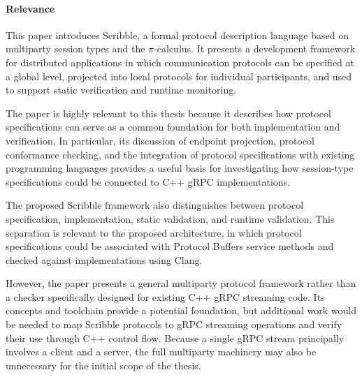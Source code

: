 \paragraph{Relevance}
This paper introduces Scribble, a formal protocol description language based on multiparty session types and the $\pi$-calculus. It presents a development framework for distributed applications in which communication protocols can be specified at a global level, projected into local protocols for individual participants, and used to support static verification and runtime monitoring.

The paper is highly relevant to this thesis because it describes how protocol specifications can serve as a common foundation for both implementation and verification. In particular, its discussion of endpoint projection, protocol conformance checking, and the integration of protocol specifications with existing programming languages provides a useful basis for investigating how session-type specifications could be connected to C++ gRPC implementations.

The proposed Scribble framework also distinguishes between protocol specification, implementation, static validation, and runtime validation. This separation is relevant to the proposed architecture, in which protocol specifications could be associated with Protocol Buffers service methods and checked against implementations using Clang.

However, the paper presents a general multiparty protocol framework rather than a checker specifically designed for existing C++ gRPC streaming code. Its concepts and toolchain provide a potential foundation, but additional work would be needed to map Scribble protocols to gRPC streaming operations and verify their use through C++ control flow. Because a single gRPC stream principally involves a client and a server, the full multiparty machinery may also be unnecessary for the initial scope of the thesis.

